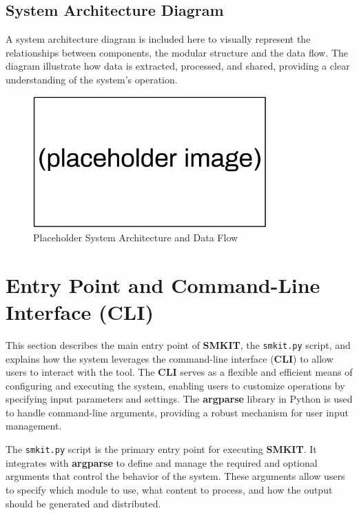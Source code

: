 \subsection{System Architecture Diagram}
\label{subsec:system_architecture_diagram}
A system architecture diagram is included here to visually represent the relationships between components, the modular structure and the data flow. The diagram illustrate how data is extracted, processed, and shared, providing a clear understanding of the system's operation.
\begin{figure}[ht]
        \centering
        \includegraphics[width=0.8\textwidth]{figures/implementation/placeholder_image.png}
        \caption{Placeholder System Architecture and Data Flow}
        \label{fig:implementation_system_architecture_and_data_flow}
    \end{figure}


\section{Entry Point and Command-Line Interface (CLI)}
\label{sec:entry_point_and_command_line_interface_cli}

This section describes the main entry point of \textbf{SMKIT}, the \texttt{smkit.py} script, and explains how the system leverages the command-line interface (\textbf{CLI}) to allow users to interact with the tool. The \textbf{CLI} serves as a flexible and efficient means of configuring and executing the system, enabling users to customize operations by specifying input parameters and settings. The \textbf{argparse} library in Python is used to handle command-line arguments, providing a robust mechanism for user input management.

The \texttt{smkit.py} script is the primary entry point for executing \textbf{SMKIT}. It integrates with \textbf{argparse} to define and manage the required and optional arguments that control the behavior of the system. These arguments allow users to specify which module to use, what content to process, and how the output should be generated and distributed.

